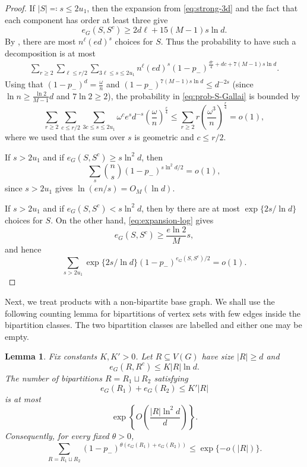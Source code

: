 \documentclass[notitlepage]{scrartcl}
\newtheorem{lemma}[thm]{Lemma}
\begin{document}
\begin{proof}
If $|S|\eqqcolon s\le2u_1$, then the expansion from \eqref{eq:strong-3d} and the fact that each component has order at least three give
\[
 e_G(S,S^c)\ge 2d\ell+15(M-1) s \ln d.
\]
By , there are most $n^\ell(ed)^s$ choices for $S$.
Thus the probability to have such a decomposition is at most
\begin{align} \label{eq:prob-S-Gallai}
    \sum_{r\ge2}\sum_{\ell\le r/2}\sum_{3\ell\le s\le2u_1} n^\ell(ed)^s (1-p_-)^{\frac{dr}{4}+dc+7(M-1) s \ln d}.
\end{align}
Using that $(1-p_-)^d=\frac{\omega}{n}$ and $(1-p_-)^{7(M-1) s \ln d} \leq d^{-2s}$ (since $\ln n \geq \frac{\ln 2}{M-1} d$ and $7 \ln 2 \geq 2$), the probability in \eqref{eq:prob-S-Gallai} is bounded by
\[
\sum_{r\ge2}\sum_{c\le r/2}\sum_{3c\le s\le2u_1} \omega^c e^s d^{-s} \left(\frac{\omega}{n}\right)^{\frac{r}{4}} \leq \sum_{r \geq 2} r \left( \frac{\omega^3}{n}\right)^{\frac{r}{4}} = o(1),
\]
where we used that the sum over $s$ is geometric and $c \leq r/2$.

If $s>2u_1$ and if $e_G(S,S^c)\ge s\ln^2 d$, then
\[
 \sum_s \binom{n}{s} (1-p_-)^{s\ln^2 d/2}=o(1),
\]
since $s>2u_1$ gives $\ln(en/s)=O_M(\ln d)$.

If $s>2u_1$ and if $e_G(S,S^c)< s\ln^2 d$, then by  there are at most $\exp\{2s/\ln d\}$ choices for $S$.
On the other hand, \eqref{eq:expansion-log} gives
\[
 e_G(S,S^c)\ge\frac{e\ln 2}{M}s,
\]
and hence
\[
 \sum_{s>2u_1}\exp\{2s/\ln d\}(1-p_-)^{e_G(S,S^c)/2}=o(1).
\]
\end{proof}

Next, we treat products with a non-bipartite base graph.
We shall use the following counting lemma for bipartitions of vertex sets with few edges inside the bipartition classes. The two bipartition classes are labelled and either one may be empty.

\begin{lemma}
\label{lem:two-colour-count}
Fix constants $K, K'>0$.
Let $R\subseteq V(G)$ have size $|R|\ge d$ and
\[
 e_G(R,R^c)\le K |R|\ln d.
\]
The number of bipartitions $R=R_1\sqcup R_2$ satisfying
\[
 e_G(R_1)+e_G(R_2)\le K' |R|
\]
is at most
\[
 \exp\left\{O\left(\frac{|R|\ln^2 d}{d}\right)\right\}.
\]
Consequently, for every fixed $\theta>0$,
\begin{equation}\label{eq:colouring-weight}
 \sum_{R=R_1\sqcup R_2} (1-p_-)^{\theta(e_G(R_1)+e_G(R_2))}
 \le\exp\{-o(|R|)\}.
\end{equation}
\end{lemma}
\end{document}
